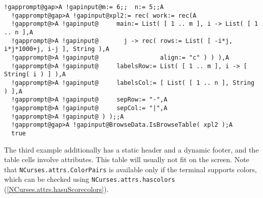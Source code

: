 \documentclass[a4paper,11pt]{report}
\begin{document}
{{{ 
\begin{Verbatim}[commandchars=!@A,fontsize=\small,frame=single,label=Example]
  !gapprompt@gap>A !gapinput@m:= 6;;  n:= 5;;A
  !gapprompt@gap>A !gapinput@xpl2:= rec( work:= rec(A
  !gapprompt@>A !gapinput@     main:= List( [ 1 .. m ], i -> List( [ 1 .. n ],A
  !gapprompt@>A !gapinput@       j -> rec( rows:= List( [ -i*j, i*j*1000+j, i-j ], String ),A
  !gapprompt@>A !gapinput@                 align:= "c" ) ) ),A
  !gapprompt@>A !gapinput@     labelsRow:= List( [ 1 .. m ], i -> [ String( i ) ] ),A
  !gapprompt@>A !gapinput@     labelsCol:= [ List( [ 1 .. n ], String ) ],A
  !gapprompt@>A !gapinput@     sepRow:= "-",A
  !gapprompt@>A !gapinput@     sepCol:= "|",A
  !gapprompt@>A !gapinput@ ) );;A
  !gapprompt@gap>A !gapinput@BrowseData.IsBrowseTable( xpl2 );A
  true
\end{Verbatim}
 

 The third example additionally has a static header and a dynamic footer, and
the table cells involve attributes. This table will usually not fit on the
screen. Note that \texttt{NCurses.attrs.ColorPairs} is available only if the terminal supports colors, which can be checked using \texttt{NCurses.attrs.has{\textunderscore}colors} (\ref{NCurses.attrs.hasuScorecolors}). 

}}}
\end{document}
